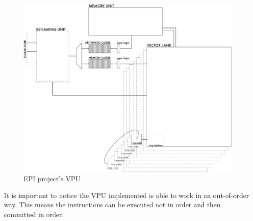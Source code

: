 \begin{figure}[H]
    \centering
    \includegraphics[scale = 0.5]{Chapter_1/img/VPU.png}
    \caption{EPI project's VPU}
    \label{VPU}
\end{figure}
It is important to notice the VPU implemented is able to work in an out-of-order way. This means the instructions can be executed not in order and then committed in order.\\


